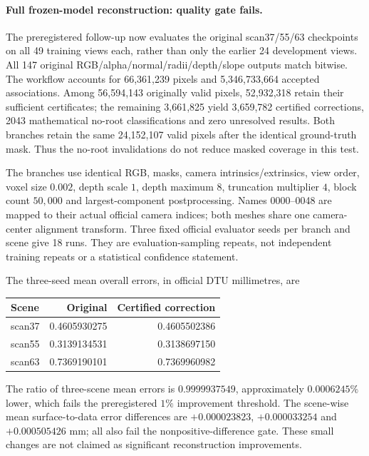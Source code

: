 \documentclass[11pt,a4paper]{article}
\begin{document}
\paragraph{Full frozen-model reconstruction: quality gate fails.}
The preregistered follow-up now evaluates the original scan37/55/63
checkpoints on all 49 training views each, rather than only the earlier
24 development views. All 147 original RGB/alpha/normal/radii/depth/slope
outputs match bitwise. The workflow accounts for 66,361,239 pixels and
5,346,733,664 accepted associations. Among 56,594,143 originally valid
pixels, 52,932,318 retain their sufficient certificates; the remaining
3,661,825 yield 3,659,782 certified corrections, 2043 mathematical no-root
classifications and zero unresolved results. Both branches retain the
same 24,152,107 valid pixels after the identical ground-truth mask.
Thus the no-root invalidations do not reduce masked coverage in this test.

The branches use identical RGB, masks, camera intrinsics/extrinsics,
view order, voxel size $0.002$, depth scale $1$, depth maximum $8$,
truncation multiplier $4$, block count $50,000$ and largest-component
postprocessing. Names 0000--0048 are mapped to their actual official
camera indices; both meshes share one camera-center alignment transform.
Three fixed official evaluator seeds per branch and scene give 18 runs.
They are evaluation-sampling repeats, not independent training repeats
or a statistical confidence statement.

The three-seed mean overall errors, in official DTU millimetres, are
\begin{center}
\begin{tabular}{lrr}
\toprule
Scene & Original & Certified correction\\
\midrule
scan37 & 0.4605930275 & 0.4605502386\\
scan55 & 0.3139134531 & 0.3138697150\\
scan63 & 0.7369190101 & 0.7369960982\\
\bottomrule
\end{tabular}
\end{center}
The ratio of three-scene mean errors is $0.9999937549$, approximately
$0.0006245\%$ lower, which fails the preregistered $1\%$ improvement
threshold. The scene-wise mean surface-to-data error differences are
$+0.000023823$, $+0.000033254$ and $+0.000505426$ mm; all also fail the
nonpositive-difference gate. These small changes are not claimed as
significant reconstruction improvements.
\end{document}
